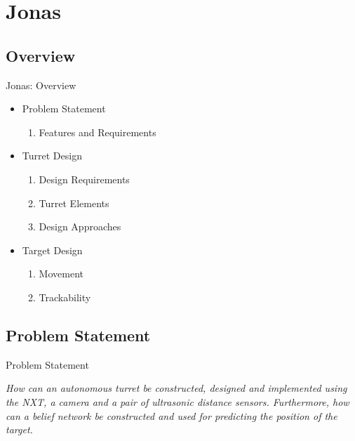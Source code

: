 \section{Jonas}
\subsection{Overview}
\begin{frame}{Jonas: Overview}
\begin{itemize}
  \item Problem Statement
  		\begin{enumerate}
  			\item Features and Requirements
		\end{enumerate}
  \item Turret Design
  		\begin{enumerate}
  			\item Design Requirements
  			\item Turret Elements
  			\item Design Approaches
		\end{enumerate}
  \item Target Design
  		\begin{enumerate}
  			\item Movement
  		 	\item Trackability
		\end{enumerate}
\end{itemize}
\end{frame}

\subsection{Problem Statement}
\begin{frame}{Problem Statement}
\begin{center}
\begin{minipage}{0.8\linewidth}
\textit{How can an autonomous turret be constructed, designed and implemented
using the NXT, a camera and a pair of ultrasonic distance sensors. Furthermore,
how can a belief network be constructed and used for predicting the position
of the target.}
\end{minipage}
\end{center}
\end{frame}

